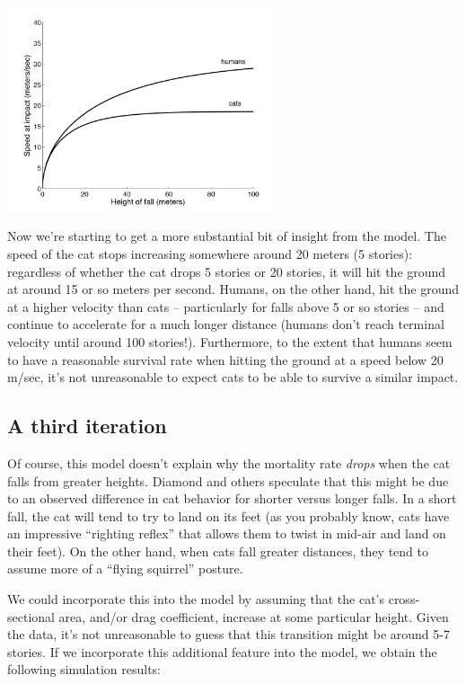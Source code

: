 \centerline{\includegraphics[height=6cm]{figs/CatSpeed}}

Now we're starting to get a more substantial bit of insight from the model.  The speed of the cat stops increasing somewhere around 20 meters (5 stories): regardless of whether the cat drops 5 stories or 20 stories, it will hit the ground at around 15 or so meters per second.  Humans, on the other hand, hit the ground at a higher velocity than cats -- particularly for falls above 5 or so stories -- and continue to accelerate for a much longer distance (humans don't reach terminal velocity until around 100 stories!).  Furthermore, to the extent that humans seem to have a reasonable survival rate when hitting the ground at a speed below 20 m/sec, it's not unreasonable to expect cats to be able to survive a similar impact.  

\subsection{A third iteration}

Of course, this model doesn't explain why the mortality rate {\it drops} when the cat falls from greater heights.  Diamond and others speculate that this might be due to an observed difference in cat behavior for shorter versus longer falls.  In a short fall, the cat will tend to try to land on its feet (as you probably know, cats have an impressive ``righting reflex'' that allows them to twist in mid-air and land on their feet).  On the other hand, when cats fall greater distances, they tend to assume more of a ``flying squirrel'' posture.  

We could incorporate this into the model by assuming that the cat's cross-sectional area, and/or drag coefficient, increase at some particular height.
Given the data, it's not unreasonable to guess that this transition might be around 5-7 stories.  If we incorporate this additional feature into the model, we obtain the following simulation results:

